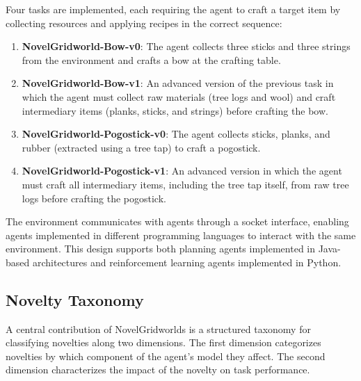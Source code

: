 Four tasks are implemented, each requiring the agent to craft a target item by collecting resources and applying recipes in the correct sequence:
\begin{enumerate}[leftmargin=*]
    \item \textbf{NovelGridworld-Bow-v0}: The agent collects three sticks and three strings from the environment and crafts a bow at the crafting table.
    \item \textbf{NovelGridworld-Bow-v1}: An advanced version of the previous task in which the agent must collect raw materials (tree logs and wool) and craft intermediary items (planks, sticks, and strings) before crafting the bow.
    \item \textbf{NovelGridworld-Pogostick-v0}: The agent collects sticks, planks, and rubber (extracted using a tree tap) to craft a pogostick.
    \item \textbf{NovelGridworld-Pogostick-v1}: An advanced version in which the agent must craft all intermediary items, including the tree tap itself, from raw tree logs before crafting the pogostick.
\end{enumerate}




The environment communicates with agents through a socket interface, enabling agents implemented in different programming languages to interact with the same environment. This design supports both planning agents implemented in Java-based architectures and reinforcement learning agents implemented in Python.


\subsection{Novelty Taxonomy}
\label{sec:ngw_novelty_taxonomy}

A central contribution of NovelGridworlds is a structured taxonomy for classifying novelties along two dimensions. The first dimension categorizes novelties by which component of the agent's model they affect. The second dimension characterizes the impact of the novelty on task performance.

